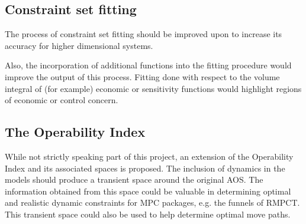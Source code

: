 \subsection{Constraint set fitting}
The process of constraint set fitting should be improved upon to increase its accuracy for higher dimensional systems.

Also, the incorporation of additional functions into the fitting procedure would improve the output of this process.
Fitting done with respect to the volume integral of (for example) economic or sensitivity functions would highlight regions of economic or control concern.

\subsection{The Operability Index}
While not strictly speaking part of this project, an extension of the Operability Index and its associated spaces is proposed.
The inclusion of dynamics in the models should produce a transient space around the original AOS.
The information obtained from this space could be valuable in determining optimal and realistic dynamic constraints for MPC packages, e.g. the funnels of RMPCT.
This transient space could also be used to help determine optimal move paths.


